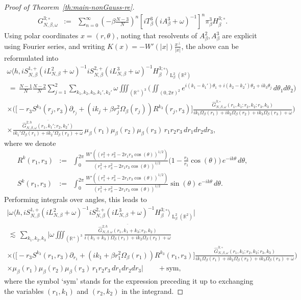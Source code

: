 \documentclass[a4paper,11pt,reqno,noindent]{amsart}
\theoremstyle{plain}
\numberwithin{equation}{section}
\newcommand{\R}{\mathbb R}
\newcommand{\3}{|\!|\!|}
\newcommand{\Ld}{\operatorname{L}}
\begin{document}
\begin{proof}[Proof of Theorem~\ref{th:main-nonGauss-re}]
\begin{eqnarray*}
G^{3;\circ}_{N,\beta,\omega}&:=&\sum_{n=0}^\infty(-\beta\tfrac{N-3}N)^n[iT_\beta^3(iA_\beta^3+\omega)^{-1}]^n\pi_\beta^3H^{3;\circ}_\beta.
\end{eqnarray*}
Using polar coordinates $x=(r,\theta)$, noting that resolvents of $A^2_\beta,A^3_\beta$ are explicit using Fourier series, and writing $K(x)=-W'(|x|)\tfrac{x^\bot}{|x|}$, the above can be reformulated into
\begin{multline*}
\omega \Big\langle h,iS_{N,\beta}^{1,+}(iL_{N,\beta}^2+\omega)^{-1}iS_{N,\beta}^{2,+}(iL_{N,\beta}^3+\omega)^{-1}H_\beta^{3;\circ}\Big\rangle_{\Ld^2_\beta(\R^2)}\\
\,=\,\tfrac{N-1}N\tfrac{N-2}N\sum_{j=1}^2\sum_{k_1,k_2,k_3,k_1',k_2'}\omega\iiint_{(\R^+)^3}\Big(\iint_{(0,2\pi)^2}e^{i(k_1-k_1')\theta_1+i(k_2-k_2')\theta_2+ik_3\theta_j}\,d\theta_1d\theta_2\Big)\\
\times\Big(\big[-r_3S^{k_3}(r_j,r_3)\partial_{r_j}+( ik_j+\beta r_j^2\Omega_\beta(r_j))R^{k_3}(r_j,r_3)\big]\tfrac{\widehat G^{3;\circ}_{N,\beta,\omega}(r_1,k_1;r_2,k_2;r_3,k_3)}{ik_1\Omega_\beta(r_1)+ik_2\Omega_\beta(r_2)+ik_3\Omega_\beta(r_3)+\omega}\Big)\\
\times \tfrac{\overline{\widehat G^{2;h}_{N,\beta,\omega}(r_1,k_1';r_2,k_2')}}{ik_1'\Omega_\beta(r_1)+ik_2'\Omega_\beta(r_2)+\omega}\,\mu_\beta(r_1)\mu_\beta(r_2)\mu_\beta(r_3)\,r_1r_2r_3\,dr_1dr_2dr_3,
\end{multline*}
where we denote
\begin{eqnarray*}
R^k(r_1,r_3)&:=&\int_0^{2\pi}\tfrac{W'((r_1^2+r_3^2-2r_1r_3\cos(\theta))^{1/2})}{(r_1^2+r_3^2-2r_1r_3\cos(\theta))^{1/2}}\big(1-\tfrac{r_3}{r_1}\cos(\theta)\big)\,e^{-ik\theta}\,d\theta,\\
S^k(r_1,r_3)&:=&\int_0^{2\pi}\tfrac{W'((r_1^2+r_3^2-2r_1r_3\cos(\theta))^{1/2})}{(r_1^2+r_3^2-2r_1r_3\cos(\theta))^{1/2}}\sin(\theta)\,e^{-ik\theta}\,d\theta.
\end{eqnarray*}
Performing integrals over angles, this leads  to
\begin{multline*}
\Big|\omega \Big\langle h,iS_{N,\beta}^{1,+}(iL_{N,\beta}^2+\omega)^{-1}iS_{N,\beta}^{2,+}(iL_{N,\beta}^3+\omega)^{-1}H_\beta^{3;\circ}\Big\rangle_{\Ld^2_\beta(\R^2)}\Big|\\
\,\lesssim\,\sum_{k_1,k_2,k_3}\bigg|\omega\iiint_{(\R^+)^3}\tfrac{\overline{\widehat G^{2;h}_{N,\beta,\omega}(r_1,k_1+k_3;r_2,k_2)}}{i(k_1+k_3)\Omega_\beta(r_1)+ik_2\Omega_\beta(r_2)+\omega}\\
\times\Big(\big[\!-r_3S^{k_3}(r_1,r_3)\partial_{r_1}+( ik_1+\beta r_1^2\Omega_\beta(r_1))R^{k_3}(r_1,r_3)\big]\tfrac{\widehat G^{3;\circ}_{N,\beta,\omega}(r_1,k_1;r_2,k_2;r_3,k_3)}{ik_1\Omega_\beta(r_1)+ik_2\Omega_\beta(r_2)+ik_3\Omega_\beta(r_3)+\omega}\Big)\\
\times\mu_\beta(r_1)\mu_\beta(r_2)\mu_\beta(r_3)\,r_1r_2r_3\,dr_1dr_2dr_3\bigg|\qquad+\text{sym},
\end{multline*}
where the symbol `$\text{sym}$' stands for the expression preceding it up to exchanging the variables $(r_1,k_1)$ and $(r_2,k_2)$ in the integrand.


\end{proof}
\end{document}

